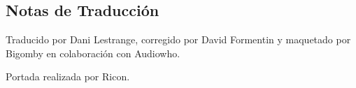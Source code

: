 \begin{center}
\section*{Notas de Traducción}
\end{center}

\mbox{}

\begingroup
\fontsize{12pt}{8pt}\selectfont
\parindent=0pt

Traducido por Dani Lestrange, corregido por David Formentin y
maquetado por Bigomby en colaboración con Audiowho.

\mbox{}

Portada realizada por Ricon.

\endgroup